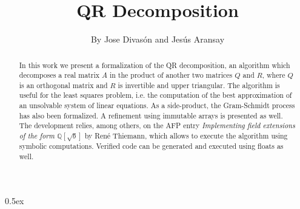 \documentclass[11pt,a4paper]{article}
\begin{document}
\title{QR Decomposition}
\author{By Jose Divas\'on and Jes\'us Aransay}
\maketitle


\begin{abstract}
In this work we present a formalization of the QR decomposition, an algorithm which decomposes
a real matrix $A$ in the product of another two matrices $Q$ and $R$, where $Q$ is an orthogonal matrix
and $R$ is invertible and upper triangular. The algorithm is useful for the least squares problem, 
i.e. the computation of the best approximation of an unsolvable system of linear equations. 
As a side-product, the Gram-Schmidt process has also been formalized. A refinement using immutable arrays is presented as well. 
The development relies, among others, on the AFP entry \emph{Implementing field extensions of the form $\mathbb{Q}[\sqrt{b}]$} by Ren\'e Thiemann,
which allows to execute the algorithm using symbolic computations. Verified code can be generated and executed using floats as well.

\end{abstract}

\tableofcontents

\parindent 0pt\parskip 0.5ex



%
%
\end{document}
